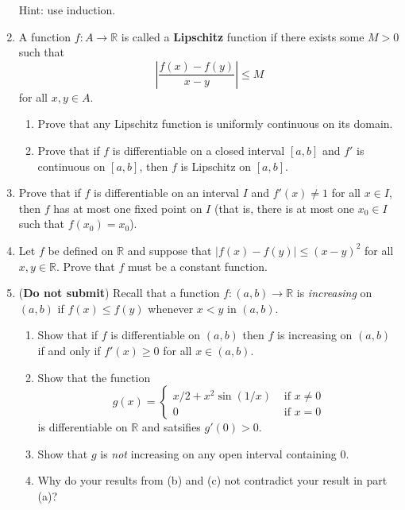\documentclass[letterpaper,12pt]{article}
\newcommand{\R}{\mathbb{R}}
\newcommand{\abs}[1]{\lvert #1\rvert}
\newcommand{\Abs}[1]{\left| #1\right|}
\begin{document}
\begin{enumerate}
Hint: use induction.
\newpage
\item A function $f:A\to\R$ is called a {\bf Lipschitz} function if there exists some $M>0$ such that
\[
 \Abs{\frac{f(x)-f(y)}{x-y}}\leq M
\]
for all $x,y\in A$.
\begin{enumerate}
 \item Prove that any Lipschitz function is uniformly continuous on its domain.
 \item Prove that if $f$ is differentiable on a closed interval $[a,b]$ and $f'$ is continuous on $[a,b]$, then $f$ is Lipschitz on $[a,b]$.
\end{enumerate}
 \item Prove that if $f$ is differentiable on an interval $I$ and $f'(x)\neq 1$ for all $x\in I$, then $f$ has at most one fixed point on $I$ (that is, there is at most one $x_0\in I$ such that $f(x_0)=x_0$).
 \item Let $f$ be defined on $\R$ and suppose that $\abs{f(x)-f(y)}\leq (x-y)^2$ for all $x,y\in\R$. Prove that $f$ must be a constant function.
 \item ({\bf Do not submit}) Recall that a function $f:(a,b)\to\R$ is {\em increasing} on $(a,b)$ if $f(x)\leq f(y)$ whenever $x<y$ in $(a,b)$.
\begin{enumerate}
 \item Show that if $f$ is differentiable on $(a,b)$ then $f$ is increasing on $(a,b)$ if and only if $f'(x)\geq 0$ for all $x\in (a,b)$.
 \item Show that the function
\[
 g(x) = \begin{cases} x/2+x^2\sin(1/x) & \text{ if } x\neq 0 \\ 0 & \text{ if } x=0\end{cases}
\]
is differentiable on $\R$ and satsifies $g'(0)>0$.
 \item Show that $g$ is {\em not} increasing on any open interval containing 0.
 \item Why do your results from (b) and (c) not contradict your result in part (a)?
\end{enumerate}
 




\end{enumerate}
\end{document}
